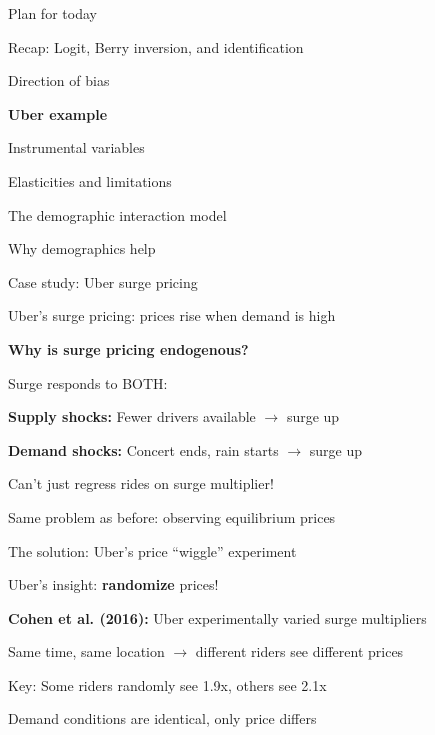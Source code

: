 \documentclass[notes,11pt, aspectratio=169]{beamer}
\newenvironment{wideitemize}{\itemize\addtolength{\itemsep}{10pt}}{\enditemize}
\newenvironment{wideenumerate}{\enumerate\addtolength{\itemsep}{10pt}}{\endenumerate}
\begin{document}
\begin{frame}{Plan for today}
  \begin{wideenumerate}
    \item Recap: Logit, Berry inversion, and identification
    \item Direction of bias
    \item \textbf{Uber example}
    \item Instrumental variables
    \item Elasticities and limitations
    \item The demographic interaction model
    \item Why demographics help
  \end{wideenumerate}
\end{frame}

\begin{frame}{Case study: Uber surge pricing}
	\begin{wideitemize}
		\item Uber's surge pricing: prices rise when demand is high
		\item \textbf{Why is surge pricing endogenous?} \pause
		\item Surge responds to BOTH:
		\begin{wideitemize}
			\vspace{5pt}
			\item \textbf{Supply shocks:} Fewer drivers available $\rightarrow$ surge up
			\item \textbf{Demand shocks:} Concert ends, rain starts $\rightarrow$ surge up
		\end{wideitemize}
		\item Can't just regress rides on surge multiplier!
		\item Same problem as before: observing equilibrium prices
	\end{wideitemize}
\end{frame}

\begin{frame}{The solution: Uber's price ``wiggle'' experiment}
	\begin{wideitemize}
		\item Uber's insight: \textbf{randomize} prices!
		\item \textbf{Cohen et al. (2016):} Uber experimentally varied surge multipliers
		\item Same time, same location $\rightarrow$ different riders see different prices
		\item Key: Some riders randomly see 1.9x, others see 2.1x
		\item Demand conditions are identical, only price differs
	\end{wideitemize}
\end{frame}
\end{document}
